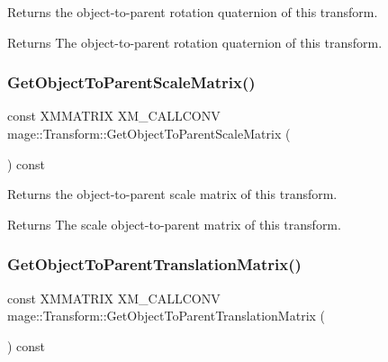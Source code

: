 Returns the object-\/to-\/parent rotation quaternion of this transform.

\begin{DoxyReturn}{Returns}
The object-\/to-\/parent rotation quaternion of this transform. 
\end{DoxyReturn}
\hypertarget{classmage_1_1_transform_af69febeb1c8795d4d3e71a712e4ab3b8}{}\label{classmage_1_1_transform_af69febeb1c8795d4d3e71a712e4ab3b8} 
\subsubsection{\texorpdfstring{Get\+Object\+To\+Parent\+Scale\+Matrix()}{GetObjectToParentScaleMatrix()}}
{\footnotesize\ttfamily const X\+M\+M\+A\+T\+R\+IX X\+M\+\_\+\+C\+A\+L\+L\+C\+O\+NV mage\+::\+Transform\+::\+Get\+Object\+To\+Parent\+Scale\+Matrix (\begin{DoxyParamCaption}{ }\end{DoxyParamCaption}) const\hspace{0.3cm}{\ttfamily [noexcept]}}

Returns the object-\/to-\/parent scale matrix of this transform.

\begin{DoxyReturn}{Returns}
The scale object-\/to-\/parent matrix of this transform. 
\end{DoxyReturn}
\hypertarget{classmage_1_1_transform_adfecbcf77681da90a0d22690621936b3}{}\label{classmage_1_1_transform_adfecbcf77681da90a0d22690621936b3} 
\subsubsection{\texorpdfstring{Get\+Object\+To\+Parent\+Translation\+Matrix()}{GetObjectToParentTranslationMatrix()}}
{\footnotesize\ttfamily const X\+M\+M\+A\+T\+R\+IX X\+M\+\_\+\+C\+A\+L\+L\+C\+O\+NV mage\+::\+Transform\+::\+Get\+Object\+To\+Parent\+Translation\+Matrix (\begin{DoxyParamCaption}{ }\end{DoxyParamCaption}) const\hspace{0.3cm}{\ttfamily [noexcept]}}

